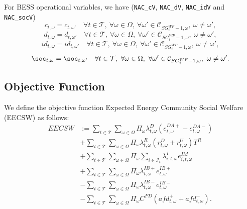 For BESS operational variables, we have (\verb|NAC_cV|, \verb|NAC_dV|, \verb|NAC_idV| and \verb|NAC_socV|)
\begin{equation} \label{EQ:NAC_cV1}
	c_{t, \omega} = c_{t, \omega'} \quad \forall t \in \mathcal{T}, \ \forall \omega \in \Omega, \ \forall \omega' \in \mathcal{C}_{SG^{WP}_t - 1, \omega}, \ \omega \neq \omega',
\end{equation}
\begin{equation} \label{EQ:NAC_dV1}
	d_{t, \omega} = d_{t, \omega'} \quad \forall t \in \mathcal{T}, \ \forall \omega \in \Omega, \ \forall \omega' \in \mathcal{C}_{SG^{WP}_t - 1, \omega}, \ \omega \neq \omega',
\end{equation}
\begin{equation} \label{EQ:NAC_idV1}
	id_{t, \omega} = id_{t, \omega'} \quad \forall t \in \mathcal{T}, \ \forall \omega \in \Omega, \ \forall \omega' \in \mathcal{C}_{SG^{WP}_t - 1, \omega}, \ \omega \neq \omega',
\end{equation}
\begin{equation} \label{EQ:NAC_socV1}
	\soc_{t, \omega} = \soc_{t, \omega'} \quad \forall t \in \mathcal{T}, \ \forall \omega \in \Omega, \ \forall \omega' \in \mathcal{C}_{SG^{WP}_t - 1, \omega}, \ \omega \neq \omega'.
\end{equation}

\subsection{Objective Function}
\label{SEC:ObjectiveFunction1}

We define the objective function Expected Energy Community Social Welfare (EECSW) as follows:
\begin{subequations}
	\begin{align}
		EECSW & := \sum_{t \in \mathcal{T}} \sum_{\omega \in \Omega} \Pi_{\omega} \lambda^D_{t, \omega} (e^{DA+}_{t, \omega} - e^{DA-}_{t, \omega}) \label{EQ:DAincome1} \\
		& + \sum_{t \in \mathcal{T}} \sum_{\omega \in \Omega} \Pi_{\omega} \lambda^R_{t, \omega} (r^D_{t, \omega} + r^U_{t, \omega}) T^R \label{EQ:RESincome1} \\
		& + \sum_{t \in \mathcal{T}} \sum_{\omega \in \Omega} \Pi_{\omega} \sum_{i \in \mathcal{I}_t} \lambda^{I}_{i, t, \omega} e^{IM}_{i, t, \omega} \label{EQ:IMincome1} \\
		& + \sum_{t \in \mathcal{T}} \sum_{\omega \in \Omega} \Pi_{\omega} \lambda^{IB+}_{t, \omega} e^{IB+}_{t, \omega} \label{EQ:PosIBcollectRights1} \\
		& - \sum_{t \in \mathcal{T}} \sum_{\omega \in \Omega} \Pi_{\omega} \lambda^{IB-}_{t, \omega} e^{IB-}_{t, \omega} \label{EQ:NegIBPayObligations1} \\
		& - \sum_{t \in \mathcal{T}} \sum_{\omega \in \Omega} \Pi_{\omega} C^{FD} (afd^+_{t, \omega} + afd^-_{t, \omega}). \label{EQ:DemFlexPenalty1}
	\end{align}
	\label{EQ:EECSW1}
\end{subequations}


